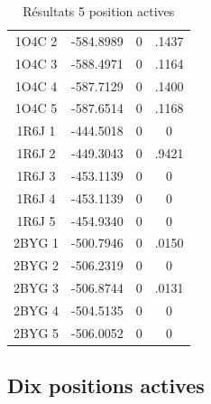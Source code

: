 \documentclass[a4paper,12pt]{article}
\begin{document}
\begin{table}[h]
\begin{tabular}{|c|c|c|c|}
   1O4C 2 & -584.8989 & 0 & .1437 \\
   1O4C 3 & -588.4971 & 0 & .1164 \\
   1O4C 4 & -587.7129 & 0 & .1400 \\
   1O4C 5 & -587.6514 & 0 & .1168 \\
   1R6J 1 & -444.5018 & 0 & 0 \\
   1R6J 2 & -449.3043 & 0 & .9421 \\
   1R6J 3 & -453.1139 & 0 & 0 \\
   1R6J 4 & -453.1139 & 0 & 0 \\
   1R6J 5 & -454.9340 & 0 & 0 \\
   2BYG 1 & -500.7946 & 0 & .0150 \\
   2BYG 2 & -506.2319 & 0 & 0 \\
   2BYG 3 & -506.8744 & 0 & .0131 \\
   2BYG 4 & -504.5135 & 0 & 0 \\
   2BYG 5 & -506.0052 & 0 & 0 \\
   
   \hline

 \end{tabular}      
 \caption{Résultats 5 position actives}
 \label{tab_echec2BYG__1}      
\end{table}


   \subsection{ Dix positions actives}
\end{document}
